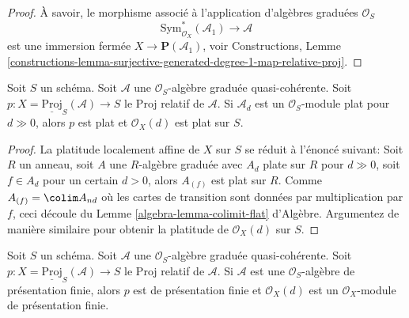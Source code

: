 \begin{proof}
À savoir, le morphisme associé à l'application d'algèbres graduées  $\mathcal{O}_S$
$$
\text{Sym}_{\mathcal{O}_X}^*(\mathcal{A}_1)
\longrightarrow
\mathcal{A}
$$
est une immersion fermée  $X \to \mathbf{P}(\mathcal{A}_1)$, voir Constructions, Lemme  \ref{constructions-lemma-surjective-generated-degree-1-map-relative-proj}.
\end{proof}

\begin{lemma}
\label{lemma-relative-proj-flat}
Soit  $S$  un schéma. Soit  $\mathcal{A}$  une  $\mathcal{O}_S$-algèbre graduée
quasi-cohérente. Soit  $p : X = \underline{\text{Proj}}_S(\mathcal{A}) \to S$  le Proj relatif de  $\mathcal{A}$. Si
 $\mathcal{A}_d$  est un  $\mathcal{O}_S$-module plat pour  $d \gg 0$, alors  $p$ 
est plat et  $\mathcal{O}_X(d)$  est plat sur  $S$.
\end{lemma}

\begin{proof}
La platitude localement affine de  $X$  sur  $S$  se réduit à
l'énoncé suivant: Soit  $R$  un anneau, soit  $A$  une
 $R$-algèbre graduée avec  $A_d$  plate sur  $R$  pour
 $d \gg 0$, soit  $f \in A_d$  pour un certain  $d > 0$, alors  $A_{(f)}$ 
est plat sur  $R$. Comme  $A_{(f)} = \colim A_{nd}$  où les cartes de transition sont
données par multiplication par  $f$, ceci découle du Lemme  \ref{algebra-lemma-colimit-flat}
d'Algèbre. Argumentez de manière similaire pour obtenir la platitude de
 $\mathcal{O}_X(d)$  sur  $S$.
\end{proof}

\begin{lemma}
\label{lemma-relative-proj-finite-presentation}
Soit  $S$  un schéma. Soit  $\mathcal{A}$  une  $\mathcal{O}_S$-algèbre graduée
quasi-cohérente. Soit  $p : X = \underline{\text{Proj}}_S(\mathcal{A}) \to S$  le Proj relatif de  $\mathcal{A}$. Si
 $\mathcal{A}$  est une  $\mathcal{O}_S$-algèbre de présentation finie, alors
 $p$  est de présentation finie et  $\mathcal{O}_X(d)$  est un  $\mathcal{O}_X$-module
de présentation finie.
\end{lemma}

